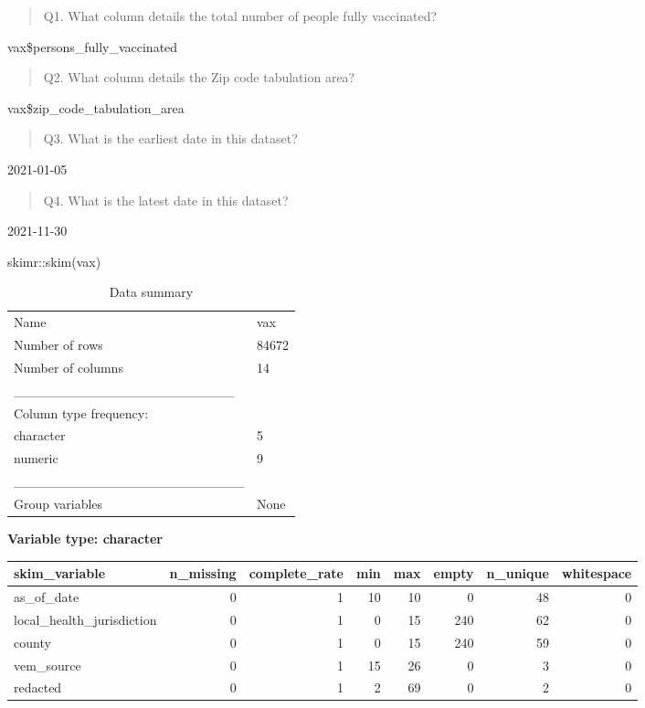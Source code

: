 \documentclass[
]{article}
\newenvironment{Shaded}{\begin{snugshade}}{\end{snugshade}}
\newcommand{\FunctionTok}[1]{\textcolor[rgb]{0.00,0.00,0.00}{#1}}
\newcommand{\NormalTok}[1]{#1}
\newcommand{\SpecialCharTok}[1]{\textcolor[rgb]{0.00,0.00,0.00}{#1}}
\begin{document}
\begin{quote}
Q1. What column details the total number of people fully vaccinated?
\end{quote}

vax\$persons\_fully\_vaccinated

\begin{quote}
Q2. What column details the Zip code tabulation area?
\end{quote}

vax\$zip\_code\_tabulation\_area

\begin{quote}
Q3. What is the earliest date in this dataset?
\end{quote}

2021-01-05

\begin{quote}
Q4. What is the latest date in this dataset?
\end{quote}

2021-11-30

\begin{Shaded}
\begin{Highlighting}[]
\NormalTok{skimr}\SpecialCharTok{::}\FunctionTok{skim}\NormalTok{(vax)}
\end{Highlighting}
\end{Shaded}

\begin{longtable}[]{@{}ll@{}}
\caption{Data summary}\tabularnewline
\toprule
\endhead
Name & vax \\
Number of rows & 84672 \\
Number of columns & 14 \\
\_\_\_\_\_\_\_\_\_\_\_\_\_\_\_\_\_\_\_\_\_\_\_ & \\
Column type frequency: & \\
character & 5 \\
numeric & 9 \\
\_\_\_\_\_\_\_\_\_\_\_\_\_\_\_\_\_\_\_\_\_\_\_\_ & \\
Group variables & None \\
\bottomrule
\end{longtable}

\textbf{Variable type: character}

\begin{longtable}[]{@{}lrrrrrrr@{}}
\toprule
skim\_variable & n\_missing & complete\_rate & min & max & empty &
n\_unique & whitespace \\
\midrule
\endhead
as\_of\_date & 0 & 1 & 10 & 10 & 0 & 48 & 0 \\
local\_health\_jurisdiction & 0 & 1 & 0 & 15 & 240 & 62 & 0 \\
county & 0 & 1 & 0 & 15 & 240 & 59 & 0 \\
vem\_source & 0 & 1 & 15 & 26 & 0 & 3 & 0 \\
redacted & 0 & 1 & 2 & 69 & 0 & 2 & 0 \\
\bottomrule
\end{longtable}
\end{document}
